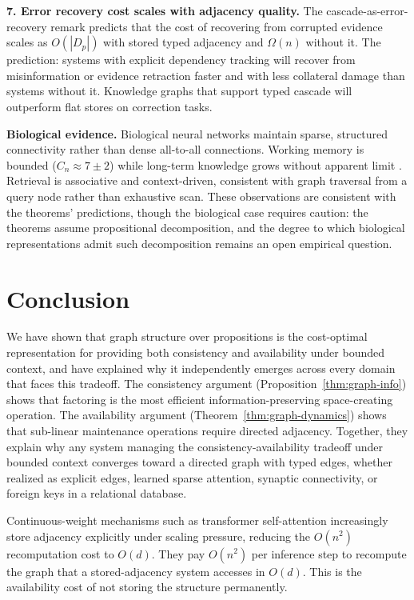 \documentclass[11pt]{article}
\theoremstyle{definition}
\begin{document}
\textbf{7. Error recovery cost scales with adjacency quality.}
The cascade-as-error-recovery remark predicts that the cost of
recovering from corrupted evidence scales as $O(|D_p|)$ with stored
typed adjacency and $\Omega(n)$ without it. The prediction: systems
with explicit dependency tracking will recover from misinformation or
evidence retraction faster and with less collateral damage than systems
without it. Knowledge graphs that support typed cascade will outperform
flat stores on correction tasks.

\textbf{Biological evidence.}
Biological neural networks maintain sparse, structured connectivity
rather than dense all-to-all connections. Working memory is bounded
($C_n \approx 7 \pm 2$) while long-term knowledge grows without
apparent limit \cite{Miller1956}. Retrieval is associative and
context-driven, consistent with graph traversal from a query node
rather than exhaustive scan. These observations are consistent with
the theorems' predictions, though the biological case requires
caution: the theorems assume propositional decomposition, and the
degree to which biological representations admit such decomposition
remains an open empirical question.

\section{Conclusion}
\label{sec:conclusion}

We have shown that graph structure over propositions is the cost-optimal
representation for providing both consistency and availability under
bounded context, and have explained why it independently emerges across
every domain that faces this tradeoff. The consistency argument
(Proposition~\ref{thm:graph-info}) shows that factoring is the most efficient
information-preserving space-creating operation. The availability
argument (Theorem~\ref{thm:graph-dynamics}) shows that sub-linear
maintenance operations require directed adjacency. Together, they
explain why any system managing the consistency-availability
tradeoff under bounded context converges toward a directed graph
with typed edges, whether realized as explicit edges, learned sparse
attention, synaptic connectivity, or foreign keys in a relational
database.

Continuous-weight mechanisms such as transformer self-attention
increasingly store adjacency explicitly under scaling pressure,
reducing the $O(n^2)$ recomputation cost to $O(d)$. They pay $O(n^2)$ per inference step to
recompute the graph that a stored-adjacency system accesses in $O(d)$.
This is the availability cost of not storing the structure permanently.
\end{document}
